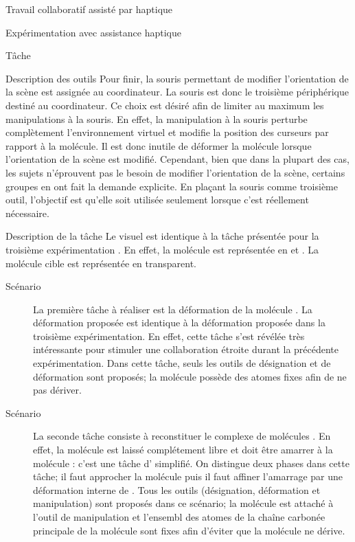 \documentclass[myfrancais]{mythesis}
\begin{document}
\begin{mychapter}{Travail collaboratif assisté par haptique}
\begin{mysection}{Expérimentation avec assistance haptique}
\begin{mysubsection}{Tâche}
\begin{mysubsubsection}{Description des outils}
					Pour finir, la souris permettant de modifier l'orientation de la scène est assignée au coordinateur.
					La souris est donc le troisième périphérique destiné au coordinateur.
					Ce choix est désiré afin de limiter au maximum les manipulations à la souris.
					En effet, la manipulation à la souris perturbe complètement l'environnement virtuel et modifie la position des curseurs par rapport à la molécule.
					Il est donc inutile de déformer la molécule lorsque l'orientation de la scène est modifié.
					Cependant, bien que dans la plupart des cas, les sujets n'éprouvent pas le besoin de modifier l'orientation de la scène, certains groupes en ont fait la demande explicite.
					En plaçant la souris comme troisième outil, l'objectif est qu'elle soit utilisée seulement lorsque c'est réellement nécessaire.
				\end{mysubsubsection}
				\begin{mysubsubsection}{Description de la tâche}
					Le visuel est identique à la tâche présentée pour la troisième expérimentation .
					En effet, la molécule est représentée en \myCPK et \myNewRibbon.
					La molécule cible est représentée en \myNewRibbon transparent.
					\begin{description}
						\item[Scénario~]
							La première tâche à réaliser est la déformation de la molécule \myUbiquitin.
							La déformation proposée est identique à la déformation proposée dans la troisième expérimentation.
							En effet, cette tâche s'est révélée très intéressante pour stimuler une collaboration étroite durant la précédente expérimentation.
							Dans cette tâche, seuls les outils de désignation et de déformation sont proposés; la molécule \myUbiquitin possède des atomes fixes afin de ne pas dériver.
						\item[Scénario~]
							La seconde tâche consiste à reconstituer le complexe de molécules \myNusENusG.
							En effet, la molécule \myNusG est laissé complétement libre et doit être amarrer à la molécule \myNusE : c'est une tâche d' simplifié.
							On distingue deux phases dans cette tâche; il faut approcher la molécule \myNusG puis il faut affiner l'amarrage par une déformation interne de \myNusG.
							Tous les outils (désignation, déformation et manipulation) sont proposés dans ce scénario; la molécule \myNusG est attaché à l'outil de manipulation et l'ensembl des atomes de la chaîne carbonée principale de la molécule \myNusE sont fixes afin d'éviter que la molécule ne dérive.
					\end{description}


\end{mysubsubsection}
\end{mysubsection}
\end{mysection}
\end{mychapter}
\end{document}
